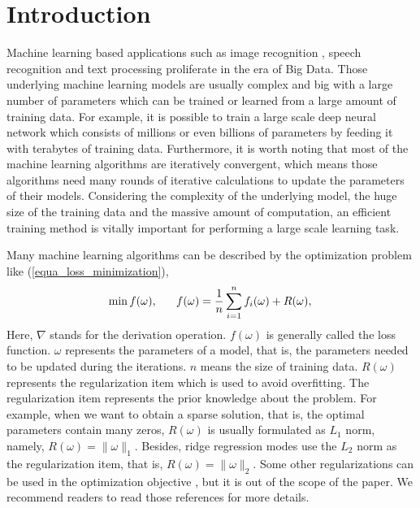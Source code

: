 \documentclass[preprint,review,11pt,a4paper]{elsarticle}
\begin{document}
\section{Introduction}
\label{introduction}

Machine learning based applications such as image recognition \cite{Coates2011An}, speech recognition \cite{dahl2012context} and text processing \cite{collobert2008unified} proliferate in the era of Big Data. Those underlying machine learning models are usually complex and big with a large number of parameters which can be trained or learned from a large amount of training data. For example, it is possible to train a large scale deep neural network which consists of millions or even billions of parameters by feeding it with terabytes of training data. Furthermore, it is worth noting that most of the machine learning algorithms are iteratively convergent, which means those algorithms need many rounds of iterative calculations to update the parameters of their models. Considering the complexity of the underlying model, the huge size of the training data and the massive amount of computation, an efficient training method is vitally important for performing a large scale learning task.

Many machine learning algorithms can be described by the optimization problem like (\ref{equa_loss_minimization}),
\begin{equation}
\label{equa_loss_minimization}

\min f(\omega),~~~~~f(\omega)=\frac{1}{n}\sum\limits_{i=1}^n f_i(\omega) + R(\omega),\\
\end{equation}  Here, $\nabla$ stands for the derivation operation. $f(\omega)$ is generally called the loss function.  $\omega$ represents the parameters of a model, that is, the parameters needed to be updated during the iterations. $n$ means the size of training data. $R(\omega)$ represents the regularization item which is used to avoid overfitting. The regularization item represents the prior knowledge about the problem. For example, when we want to obtain a sparse solution, that is, the optimal parameters contain many zeros, $R(\omega)$ is usually formulated as $L_1$ norm, namely, $R(\omega) = \lVert \omega \rVert_1$. Besides, ridge regression modes use the $L_2$ norm as the regularization item, that is, $R(\omega) = \lVert \omega \rVert_2$. Some other regularizations can be used in the optimization objective \cite{Vidaurre:2013cu, Gnecco2015Learning, Cucker2002On}, but it is out of the scope of the paper. We recommend readers to read those references for more details. 
\end{document}
